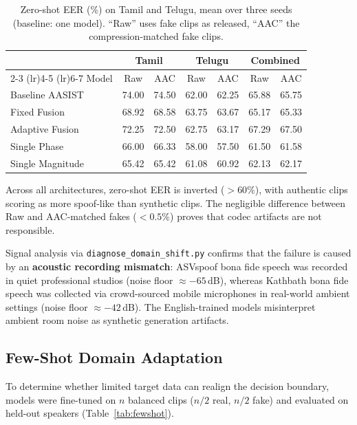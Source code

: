 \documentclass[conference]{IEEEtran}
\begin{document}
\begin{table}[t]
\caption{Zero-shot EER (\%) on Tamil and Telugu, mean over three seeds (baseline: one model). ``Raw'' uses fake clips as released, ``AAC'' the compression-matched fake clips.}
\label{tab:zeroshot}
\centering
\footnotesize
\setlength{\tabcolsep}{4.5pt}
\begin{tabular}{lcccccc}
\toprule
& \multicolumn{2}{c}{Tamil} & \multicolumn{2}{c}{Telugu} & \multicolumn{2}{c}{Combined} \\
\cmidrule(lr){2-3} \cmidrule(lr){4-5} \cmidrule(lr){6-7}
Model & Raw & AAC & Raw & AAC & Raw & AAC \\
\midrule
Baseline AASIST   & 74.00 & 74.50 & 62.00 & 62.25 & 65.88 & 65.75 \\
Fixed Fusion      & 68.92 & 68.58 & 63.75 & 63.67 & 65.17 & 65.33 \\
Adaptive Fusion   & 72.25 & 72.50 & 62.75 & 63.17 & 67.29 & 67.50 \\
Single Phase      & 66.00 & 66.33 & 58.00 & 57.50 & 61.50 & 61.58 \\
Single Magnitude  & 65.42 & 65.42 & 61.08 & 60.92 & 62.13 & 62.17 \\
\bottomrule
\end{tabular}
\end{table}

Across all architectures, zero-shot EER is inverted ($>60\%$), with authentic clips scoring as more spoof-like than synthetic clips. The negligible difference between Raw and AAC-matched fakes ($<0.5\%$) proves that codec artifacts are not responsible. 

Signal analysis via \texttt{diagnose\_domain\_shift.py} confirms that the failure is caused by an \textbf{acoustic recording mismatch}: ASVspoof bona fide speech was recorded in quiet professional studios (noise floor $\approx -65$\,dB), whereas Kathbath bona fide speech was collected via crowd-sourced mobile microphones in real-world ambient settings (noise floor $\approx -42$\,dB). The English-trained models misinterpret ambient room noise as synthetic generation artifacts.

\subsection{Few-Shot Domain Adaptation}
To determine whether limited target data can realign the decision boundary, models were fine-tuned on $n$ balanced clips ($n/2$ real, $n/2$ fake) and evaluated on held-out speakers (Table~\ref{tab:fewshot}).
\end{document}
